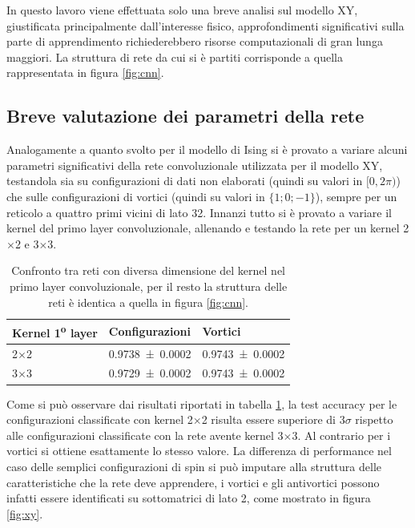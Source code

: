 \documentclass{article}
\begin{document}
In questo lavoro viene effettuata solo una breve analisi sul modello XY, giustificata principalmente dall'interesse fisico, approfondimenti significativi sulla parte di apprendimento richiederebbero risorse computazionali di gran lunga maggiori.
La struttura di rete da cui si è partiti corrisponde a quella rappresentata in figura \ref{fig:cnn}.

\subsection{Breve valutazione dei parametri della rete}
Analogamente a quanto svolto per il modello di Ising si è provato a variare alcuni parametri significativi della rete convoluzionale utilizzata per il modello XY, testandola sia su configurazioni di dati non elaborati (quindi su valori in $[0, 2\pi)$) che sulle configurazioni di vortici (quindi su valori in $\{1;0;-1\}$), sempre per un reticolo a quattro primi vicini di lato 32.
Innanzi tutto si è provato a variare il kernel del primo layer convoluzionale, allenando e testando la rete per un kernel 2$\times$2 e 3$\times$3.

\begin{table}[ht]
\begin{center}
\begin{tabular}{lll}
\toprule
Kernel 1\textsuperscript{o} layer & Configurazioni & Vortici \\
\midrule
2$\times$2 &\num{0.9738 \pm 0.0002} & \num{0.9743 \pm 0.0002}\\
3$\times$3 & \num{0.9729 \pm 0.0002} &\num{0.9743 \pm 0.0002}\\
\bottomrule
\end{tabular}
\end{center}
\caption{Confronto tra reti con diversa dimensione del kernel nel primo layer convoluzionale, per il resto la struttura delle reti è identica a quella in figura \ref{fig:cnn}.}
\label{tab:2x2vs3x3}
\end{table}

Come si può osservare dai risultati riportati in tabella \ref{tab:2x2vs3x3}, la test accuracy per le configurazioni classificate con kernel 2$\times$2 risulta essere superiore di $3\sigma$ rispetto alle configurazioni classificate con la rete avente kernel 3$\times$3. Al contrario per i vortici si ottiene esattamente lo stesso valore.
La differenza di performance nel caso delle semplici configurazioni di spin si può imputare alla struttura delle caratteristiche che la rete deve apprendere, i vortici e gli antivortici possono infatti essere identificati su sottomatrici di lato 2, come mostrato in figura \ref{fig:xy}.
\end{document}
